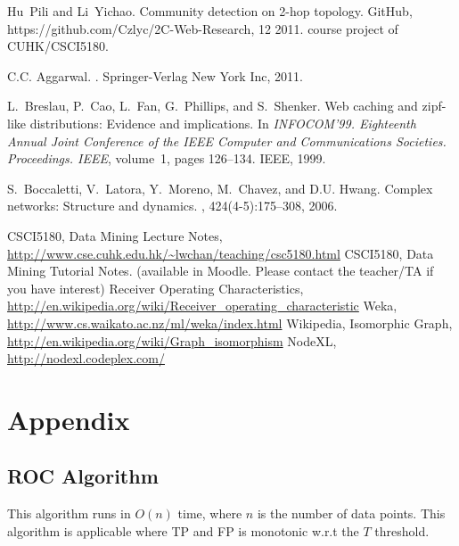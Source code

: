 \documentclass[11pt,a4paper]{article}
\begin{document}
\begin{thebibliography}{99}

Hu~Pili and Li~Yichao.
\newblock Community detection on 2-hop topology.
\newblock GitHub, https://github.com/Czlyc/2C-Web-Research, 12 2011.
\newblock course project of CUHK/CSCI5180.

C.C. Aggarwal.
.
\newblock Springer-Verlag New York Inc, 2011.

L.~Breslau, P.~Cao, L.~Fan, G.~Phillips, and S.~Shenker.
\newblock Web caching and zipf-like distributions: Evidence and implications.
\newblock In {\em INFOCOM'99. Eighteenth Annual Joint Conference of the IEEE
  Computer and Communications Societies. Proceedings. IEEE}, volume~1, pages
  126--134. IEEE, 1999.

S.~Boccaletti, V.~Latora, Y.~Moreno, M.~Chavez, and D.U. Hwang.
\newblock Complex networks: Structure and dynamics.
, 424(4-5):175--308, 2006.


	 CSCI5180, Data Mining Lecture Notes, 
		\url{http://www.cse.cuhk.edu.hk/~lwchan/teaching/csc5180.html}
	 CSCI5180, Data Mining Tutorial Notes. 
		(available in Moodle. Please contact the teacher/TA if you have 
		interest)
	 Receiver Operating Characteristics, 
		\url{http://en.wikipedia.org/wiki/Receiver_operating_characteristic}
	 Weka, 
		\url{http://www.cs.waikato.ac.nz/ml/weka/index.html}
	 Wikipedia, Isomorphic Graph, 
		\url{http://en.wikipedia.org/wiki/Graph_isomorphism}
	 NodeXL, 
		\url{http://nodexl.codeplex.com/}
\end{thebibliography}



\section*{Appendix}

\subsection*{ROC Algorithm}

This algorithm runs in $O(n)$ time, where 
$n$ is the number of data points. This algorithm 
is applicable where TP and FP is monotonic w.r.t 
the $T$ threshold. 
\end{document}
